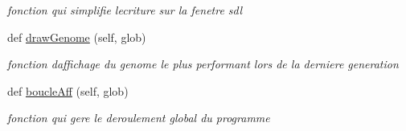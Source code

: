 \begin{DoxyCompactItemize}
\begin{DoxyCompactList}\small\item\em fonction qui simplifie l\textquotesingle{}ecriture sur la fenetre sdl \end{DoxyCompactList}\item 
def \hyperlink{classaffichage_1_1_affichage_a7ab0f7572f9af4ebcd005f631d6e1845}{draw\+Genome} (self, glob)
\begin{DoxyCompactList}\small\item\em fonction d\textquotesingle{}affichage du genome le plus performant lors de la derniere generation \end{DoxyCompactList}\item 
def \hyperlink{classaffichage_1_1_affichage_a33fa9c0044828bb8e177f36ac7927921}{boucle\+Aff} (self, glob)
\begin{DoxyCompactList}\small\item\em fonction qui gere le deroulement global du programme \end{DoxyCompactList}\end{DoxyCompactItemize}
